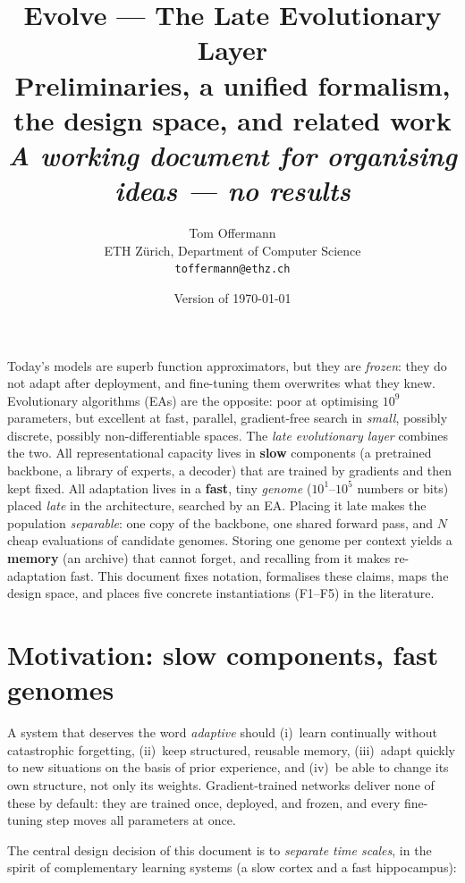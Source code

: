 \documentclass[11pt,a4paper]{article}
\title{\textbf{Evolve --- The Late Evolutionary Layer}\\[4pt]
\large Preliminaries, a unified formalism, the design space, and related work\\[2pt]
\normalsize\itshape A working document for organising ideas --- no results}
\author{Tom Offermann\\ \small ETH Zürich, Department of Computer Science\\ \small\texttt{toffermann@ethz.ch}}
\date{Version of \today}
\theoremstyle{definition}
\theoremstyle{plain}
\theoremstyle{remark}
\newcommand{\fast}[1]{\textcolor{fast}{#1}}
\newcommand{\slowc}[1]{\textcolor{slow}{#1}}
\newcommand{\memc}[1]{\textcolor{mem}{#1}}
\begin{document}
\maketitle

\begin{keybox}[title={The pitch in one paragraph}]
Today's models are superb function approximators, but they are \emph{frozen}: they do not adapt after deployment, and fine-tuning them overwrites what they knew.
Evolutionary algorithms (EAs) are the opposite: poor at optimising $10^9$ parameters, but excellent at fast, parallel, gradient-free search in \emph{small}, possibly discrete, possibly non-differentiable spaces.
The \emph{late evolutionary layer} combines the two.
All representational capacity lives in \slowc{\textbf{slow}} components (a pretrained backbone, a library of experts, a decoder) that are trained by gradients and then kept fixed.
All adaptation lives in a \fast{\textbf{fast}}, tiny \emph{genome} ($10^1$--$10^5$ numbers or bits) placed \emph{late} in the architecture, searched by an EA.
Placing it late makes the population \emph{separable}: one copy of the backbone, one shared forward pass, and $N$ cheap evaluations of candidate genomes.
Storing one genome per context yields a \memc{\textbf{memory}} (an archive) that cannot forget, and recalling from it makes re-adaptation fast.
This document fixes notation, formalises these claims, maps the design space, and places five concrete instantiations (F1--F5) in the literature.
\end{keybox}

\tableofcontents
\newpage

\section{Motivation: slow components, fast genomes}
\label{sec:motivation}

A system that deserves the word \emph{adaptive} should (i)~learn continually without catastrophic forgetting, (ii)~keep structured, reusable memory, (iii)~adapt quickly to new situations on the basis of prior experience, and (iv)~be able to change its own structure, not only its weights.
Gradient-trained networks deliver none of these by default: they are trained once, deployed, and frozen, and every fine-tuning step moves all parameters at once.

The central design decision of this document is to \emph{separate time scales}, in the spirit of complementary learning systems (a slow cortex and a fast hippocampus):
\end{document}
